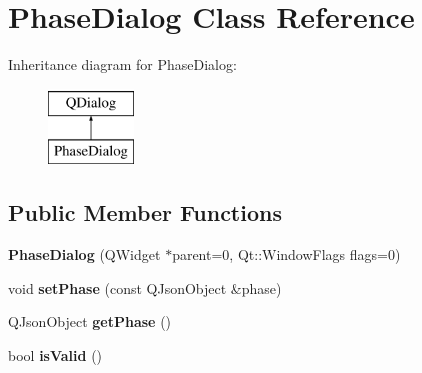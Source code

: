 \hypertarget{class_phase_dialog}{\section{Phase\-Dialog Class Reference}
\label{class_phase_dialog}
}
Inheritance diagram for Phase\-Dialog\-:\begin{figure}[H]
\begin{center}
\leavevmode
\includegraphics[height=2.000000cm]{class_phase_dialog}
\end{center}
\end{figure}
\subsection*{Public Member Functions}
\begin{DoxyCompactItemize}
\item 
\hypertarget{class_phase_dialog_aafe32ec66fe4777fb6a69507fb6ca402}{{\bfseries Phase\-Dialog} (Q\-Widget $\ast$parent=0, Qt\-::\-Window\-Flags flags=0)}\label{class_phase_dialog_aafe32ec66fe4777fb6a69507fb6ca402}

\item 
\hypertarget{class_phase_dialog_affeba82ed29b46f0cb0e7e18ff8ecf85}{void {\bfseries set\-Phase} (const Q\-Json\-Object \&phase)}\label{class_phase_dialog_affeba82ed29b46f0cb0e7e18ff8ecf85}

\item 
\hypertarget{class_phase_dialog_a148e4bea929b0a6c6d03145197051e99}{Q\-Json\-Object {\bfseries get\-Phase} ()}\label{class_phase_dialog_a148e4bea929b0a6c6d03145197051e99}

\item 
\hypertarget{class_phase_dialog_a6c2c32eeff80588d71383ef17492cbe9}{bool {\bfseries is\-Valid} ()}\label{class_phase_dialog_a6c2c32eeff80588d71383ef17492cbe9}

\end{DoxyCompactItemize}
